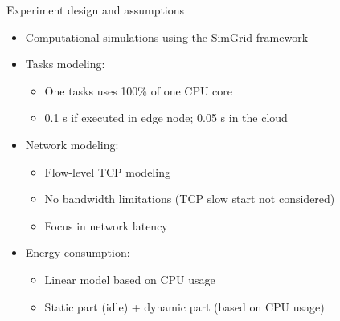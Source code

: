 \documentclass[Ligatures=TeX,table,svgnames,usetotalslideindicator,compress,10pt,aspectratio=169]{beamer}
\begin{document}
\begin{frame}{Experiment design and assumptions}

\begin{itemize}

    \item Computational simulations using the SimGrid framework\footnotemark[1]
    
    \item Tasks modeling:

    \begin{itemize}
        \item One tasks uses 100\% of one CPU core
        \item 0.1 s if executed in edge node; 0.05 s in the cloud
    \end{itemize}
    
    \item Network modeling:

    \begin{itemize}
        \item Flow-level TCP modeling
        \item No bandwidth limitations (TCP slow start not considered)
        \item Focus in network latency
    \end{itemize}

    \item Energy consumption:
    \begin{itemize}
        \item Linear model based on CPU usage
        \item Static part (idle) + dynamic part (based on CPU usage)
    \end{itemize}

\end{itemize}

  \end{frame}
\end{document}
